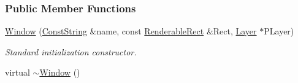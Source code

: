 \subsubsection*{Public Member Functions}
\begin{DoxyCompactItemize}
\item 
\hyperlink{classMezzanine_1_1UI_1_1Window_a3195ffbbdf76bc22ff626739872caf37}{Window} (\hyperlink{namespaceMezzanine_a63cd699ac54b73953f35ec9cfc05e506}{ConstString} \&name, const \hyperlink{structMezzanine_1_1UI_1_1RenderableRect}{RenderableRect} \&Rect, \hyperlink{classMezzanine_1_1UI_1_1Layer}{Layer} $\ast$PLayer)
\begin{DoxyCompactList}\small\item\em Standard initialization constructor. \item\end{DoxyCompactList}\item 
\hypertarget{classMezzanine_1_1UI_1_1Window_a5e40510a0ee0e248e6ea8526a88e6974}{
virtual \hyperlink{classMezzanine_1_1UI_1_1Window_a5e40510a0ee0e248e6ea8526a88e6974}{$\sim$Window} ()}
\label{classMezzanine_1_1UI_1_1Window_a5e40510a0ee0e248e6ea8526a88e6974}


\end{DoxyCompactItemize}
